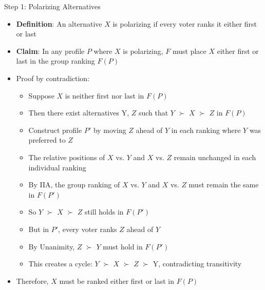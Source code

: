\documentclass[10pt,handout]{beamer}
\begin{document}
\begin{frame}{Step 1: Polarizing Alternatives}
  \begin{itemize}[<+->]
    \item \textbf{Definition}: An alternative $X$ is polarizing if every voter ranks it either first or last
    \item \textbf{Claim}: In any profile $P$ where $X$ is polarizing, $F$ must place $X$ either first or last in the group ranking $F(P)$
    \item Proof by contradiction:
      \begin{itemize}
        \item Suppose $X$ is neither first nor last in $F(P)$
        \item Then there exist alternatives Y, $Z$ such that $Y$ $\succ$ $X$ $\succ$ $Z$ in $F(P)$
        \item Construct profile $P'$ by moving $Z$ ahead of $Y$ in each ranking where $Y$ was preferred to $Z$ 
        \item The relative positions of $X$ vs. $Y$ and $X$ vs. $Z$ remain unchanged in each individual ranking
        \item By IIA, the group ranking of $X$ vs. $Y$ and $X$ vs. $Z$ must remain the same in $F(P')$
        \item So $Y$ $\succ$ $X$ $\succ$ $Z$ still holds in $F(P')$
        \item But in $P'$, every voter ranks $Z$ ahead of $Y$
        \item By Unanimity, $Z$ $\succ$ $Y$ must hold in $F(P')$
        \item This creates a cycle: $Y$ $\succ$ $X$ $\succ$ $Z$ $\succ$ Y, contradicting transitivity
      \end{itemize}
    \item Therefore, $X$ must be ranked either first or last in $F(P)$
  \end{itemize}
\end{frame}
\end{document}
